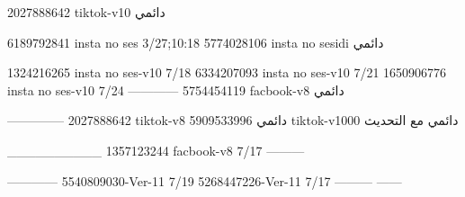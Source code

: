 2027888642 tiktok-v10
دائمي

6189792841 insta no ses
3/27;10:18
5774028106 insta no sesidi
دائمي

1324216265 insta no ses-v10
7/18
6334207093 insta no ses-v10
7/21
1650906776 insta no ses-v10
7/24
------------
5754454119 facbook-v8
دائمي


--------------
2027888642 tiktok-v8
دائمي
5909533996 tiktok-v1000
دائمي مع التحديث

__________
1357123244 facbook-v8
7/17
---------

------------
5540809030-Ver-11
7/19
5268447226-Ver-11
7/17
---------
------
